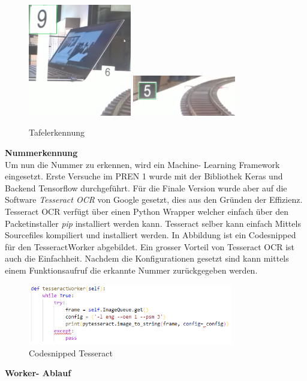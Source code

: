 \documentclass[../../main.tex]{subfiles}
\begin{document}
\vspace{0.5cm}

\begin{figure}[H] %
  \centering
  \includegraphics[width=0.4\textwidth]{tafel-weiss.png}
  \includegraphics[width=0.4\textwidth]{tafel-schwarz.png}
  \caption{Tafelerkennung}
  \label{fig:tafelerkennung}
\end{figure}

\vspace{0.5cm}

\textbf{Nummerkennung}\\
Um nun die Nummer zu erkennen, wird ein Machine- Learning Framework eingesetzt. Erste Versuche im PREN 1 wurde mit der Bibliothek Keras und Backend Tensorflow durchgeführt. Für die Finale Version wurde aber auf die Software \textit{Tesseract OCR} von Google gesetzt, dies aus den Gründen der Effizienz. Tesseract OCR verfügt über einen Python Wrapper welcher einfach über den Packetinstaller \textit{pip} installiert werden kann. Tesseract selber kann einfach Mittels Sourcefiles kompiliert und installiert werden. In Abbildung ist ein Codesnipped für den TesseractWorker abgebildet. Ein grosser Vorteil von Tesseract OCR ist auch die Einfachheit. Nachdem die Konfigurationen gesetzt sind kann mittels einem Funktionsaufruf die erkannte Nummer zurückgegeben werden.

\begin{figure}[H] %
  \centering
  \includegraphics[width=0.8\textwidth]{codesnipped-tesseract.png}
  \caption{Codesnipped Tesseract}
  \label{fig:codesnipped_tesseract}
\end{figure}

\newpage

\textbf{Worker- Ablauf}\\
\end{document}
